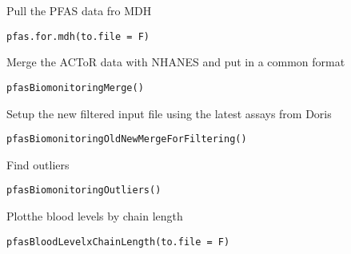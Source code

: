 \documentclass[a4paper]{book}
\begin{document}
%
\begin{Description}\relax
Pull the PFAS data fro MDH
\end{Description}
%
\begin{Usage}
\begin{verbatim}
pfas.for.mdh(to.file = F)
\end{verbatim}
\end{Usage}
%
\begin{Description}\relax
Merge the ACToR data with NHANES and put in a common format
\end{Description}
%
\begin{Usage}
\begin{verbatim}
pfasBiomonitoringMerge()
\end{verbatim}
\end{Usage}
%
\begin{Description}\relax
Setup the new filtered input file using the latest assays from Doris
\end{Description}
%
\begin{Usage}
\begin{verbatim}
pfasBiomonitoringOldNewMergeForFiltering()
\end{verbatim}
\end{Usage}
%
\begin{Description}\relax
Find outliers
\end{Description}
%
\begin{Usage}
\begin{verbatim}
pfasBiomonitoringOutliers()
\end{verbatim}
\end{Usage}
%
\begin{Description}\relax
Plotthe blood levels by chain length
\end{Description}
%
\begin{Usage}
\begin{verbatim}
pfasBloodLevelxChainLength(to.file = F)
\end{verbatim}
\end{Usage}
\end{document}
